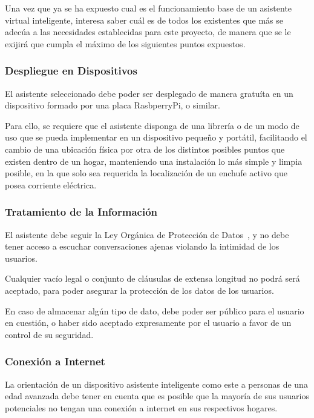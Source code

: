 Una vez que ya se ha expuesto cual es el funcionamiento base de un asistente virtual inteligente, interesa saber cuál es de todos los existentes que más se adecúa a las necesidades establecidas para este proyecto, de manera que se le exijirá que cumpla el máximo de los siguientes puntos expuestos.

\subsubsection{Despliegue en Dispositivos}

El asistente seleccionado debe poder ser desplegado de manera gratuíta en un dispositivo formado por una placa RasbperryPi, o similar.

Para ello, se requiere que el asistente disponga de una librería o de un modo de uso que se pueda implementar en un dispositivo pequeño y portátil, facilitando el cambio de una ubicación física por otra de los distintos posibles puntos que existen dentro de un hogar, manteniendo una instalación lo más simple y limpia posible, en la que solo sea requerida la localización de un enchufe activo que posea corriente eléctrica.

\subsubsection{Tratamiento de la Información}

El asistente debe seguir la Ley Orgánica de Protección de Datos~\cite{lopd}, y no debe tener acceso a escuchar conversaciones ajenas violando la intimidad de los usuarios.

Cualquier vacío legal o conjunto de cláusulas de extensa longitud no podrá será aceptado, para poder asegurar la protección de los datos de los usuarios.

En caso de almacenar algún tipo de dato, debe poder ser público para el usuario en cuestión, o haber sido aceptado expresamente por el usuario a favor de un control de su seguridad.

\subsubsection{Conexión a Internet}

La orientación de un dispositivo asistente inteligente como este a personas de una edad avanzada debe tener en cuenta que es posible que la mayoría de sus usuarios potenciales no tengan una conexión a internet en sus respectivos hogares.

